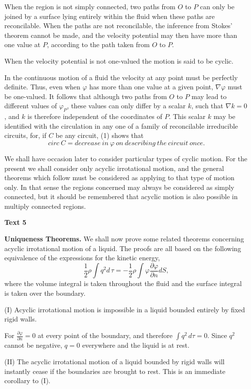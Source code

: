 \documentclass[a4paper]{article}
\newcommand{\ESect}[1]{\medskip\par{\large \textbf{#1}}\par}
\newcommand{\Eqn}[1]{\begin{equation}#1\end{equation}}
\begin{document}
When the region is not simply connected, two paths from $O$ to $P$ can only be joined by a surface lying entirely within the
fluid when these paths are reconcilable. When the paths are not reconcilable, the inference from Stokes' theorem cannot be
made, and the velocity potential may then have more than one value at $P$, according to the path taken from $O$ to $P$.

When the velocity potential is not one-valued the motion is said to be cyclic.

In the continuous motion of a fluid the velocity at any point must be perfectly definite. Thus, even when $\varphi$ has more
than one value at a given point, $\nabla\varphi$ must be one-valued. It follows that although two paths from $O$ to $P$ may
lead to different values of $\varphi_P$, these values can only differ by a scalar $k$, such that $\nabla k = 0$, and $k$ is
therefore independent of the coordinates of $P$. This scalar $k$ may be identified with the circulation in any one of a
family of reconcilable irreducible circuits, for, if $C$ be any circuit, (1) shows that
\Eqn{circ~C=decrease~in~\varphi~on~describing~the~circuit~once.}

We shall have occasion later to consider particular types of cyclic motion. For the present we shall consider only acyclic
irrotational motion, and the general theorems which follow must be considered as applying to that type of motion only. In
that sense the regions concerned may always be considered as simply connected, but it should be remembered that acyclic motion
is also possible in multiply connected regions.

\setcounter{equation}{0}
\ESect{Text 5}
\textbf{Uniqueness Theorems.} We shall now prove some related theorems concerning acyclic irrotational motion of a liquid.
The proofs are all based on the following equivalence of the expressions for the kinetic energy,
\Eqn{\frac{1}{2}\rho\int q^2 d\,\tau=-\frac{1}{2}\rho\int\varphi \frac{\partial \varphi}{\partial n} dS,}
where the volume integral is taken throughout the fluid and the surface integral is taken over the boundary.

(I) Acyclic irrotational motion is impossible in a liquid bounded entirely by fixed rigid walls.

For $\frac{\partial \varphi}{\partial n} =0$ at every point of the boundary, and therefore $\int q^2 \, d\tau = 0$. Since $q^2$
cannot be negative, $q = 0$ everywhere and the liquid is at rest.

(II) The acyclic irrotational motion of a liquid bounded by rigid walls will instantly cease if the boundaries are brought
to rest. This is an immediate corollary to (I).
\end{document}
